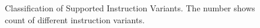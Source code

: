 \begin{figure}
\caption{Classification of Supported Instruction Variants. \textmd{The number shows count of different instruction variants.}}
 \label{fig:IC}
\end{figure}

